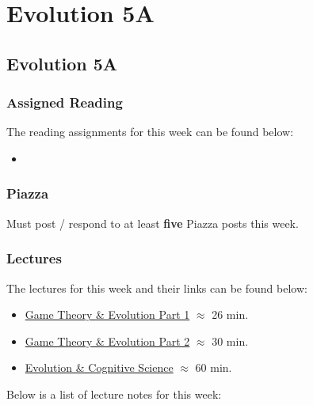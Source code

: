 \clearpage

\renewcommand{\ChapTitle}{Evolution 5A}
\renewcommand{\SectionTitle}{Evolution 5A}

\chapter{\ChapTitle}
\section{\SectionTitle}

\subsection{Assigned Reading}

The reading assignments for this week can be found below:

\begin{itemize}
    \item {}
\end{itemize}

\subsection{Piazza}

Must post / respond to at least \textbf{five} Piazza posts this week.  

\subsection{Lectures}

The lectures for this week and their links can be found below:

\begin{itemize}
    \item \href{https://www.youtube.com/watch?v=fBDjfR1KCZA}{Game Theory \& Evolution Part 1} $\approx$ 26 min.
    \item \href{https://www.youtube.com/watch?v=b4yV21CZJFA}{Game Theory \& Evolution Part 2} $\approx$ 30 min.
    \item \href{https://www.youtube.com/watch?v=vbCVXcXF88I}{Evolution \& Cognitive Science} $\approx$ 60 min.
\end{itemize}

\noindent Below is a list of lecture notes for this week:


